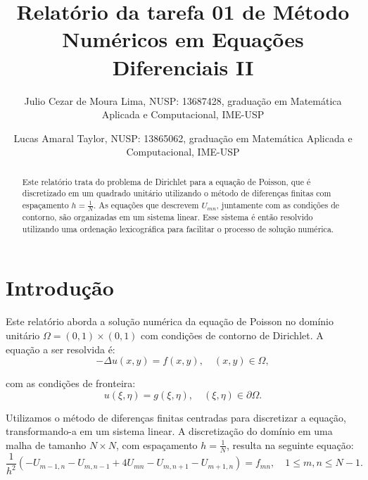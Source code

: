 \documentclass[column,amsmath,amssymb,floatfix]{revtex4}
\begin{document}
\title{Relatório da tarefa 01 de Método Numéricos em Equações Diferenciais II}
\author{Julio Cezar de Moura Lima, NUSP: 13687428, graduação em Matemática Aplicada e Computacional, IME-USP}
\author{Lucas Amaral Taylor, NUSP: 13865062, graduação em Matemática Aplicada e Computacional, IME-USP}


\begin{abstract}
    \baselineskip 11pt
    \begin{center}
        Este relatório trata do problema de Dirichlet para a equação de Poisson, que é discretizado em um quadrado unitário utilizando o método de diferenças finitas com espaçamento $h = \frac{1}{N}$. As equações que descrevem $U_{mn}$, juntamente com as condições de contorno, são organizadas em um sistema linear. Esse sistema é então resolvido utilizando uma ordenação lexicográfica para facilitar o processo de solução numérica.
    \end{center}
\end{abstract}


\maketitle

    \section{Introdução}
        Este relatório aborda a solução numérica da equação de Poisson no domínio unitário $\Omega = (0,1) \times (0,1)$ com condições de contorno de Dirichlet. A equação a ser resolvida é:
        \begin{equation*}
             -\Delta u(x, y) = f(x, y), \quad (x, y) \in \Omega, 
        \end{equation*}
    
        com as condições de fronteira:
        \begin{equation*}
            u(\xi, \eta) = g(\xi, \eta), \quad (\xi, \eta) \in \partial\Omega.
        \end{equation*}
        
        Utilizamos o método de diferenças finitas centradas para discretizar a equação, transformando-a em um sistema linear. A discretização do domínio em uma malha de tamanho $N \times N$, com espaçamento $h = \frac{1}{N}$, resulta na seguinte equação:
        \begin{equation*}
            \frac{1}{h^2}(-U_{m-1,n} - U_{m,n-1} + 4U_{mn} - U_{m,n+1} - U_{m+1,n}) = f_{mn}, \quad 1 \leq m,n \leq N-1.
        \end{equation*}
    
\end{document}
